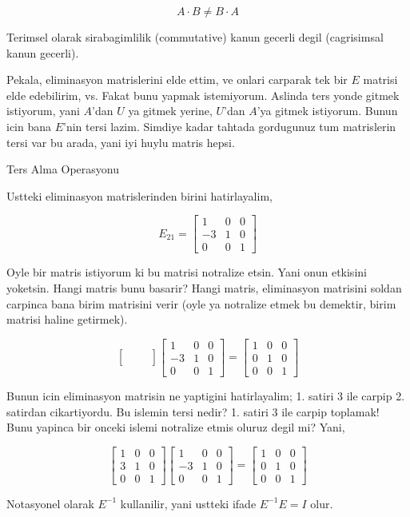 \documentclass[12pt,fleqn]{article}\usepackage{../common}
\begin{document}
$$ A \cdot B \ne B \cdot A $$

Terimsel olarak sirabagimlilik (commutative) kanun gecerli degil
(cagrisimsal kanun gecerli).

Pekala, eliminasyon matrislerini elde ettim, ve onlari carparak tek bir $E$
matrisi elde edebilirim, vs. Fakat bunu yapmak istemiyorum. Aslinda ters
yonde gitmek istiyorum, yani $A$'dan $U$ ya gitmek yerine, $U$'dan $A$'ya
gitmek istiyorum. Bunun icin bana $E$'nin tersi lazim. Simdiye kadar
tahtada gordugunuz tum matrislerin tersi var bu arada, yani iyi huylu
matris hepsi.

Ters Alma Operasyonu

Ustteki eliminasyon matrislerinden birini hatirlayalim, 

$$ E_{21} = \left[\begin{array}{rrr}
1 & 0 & 0 \\
-3 & 1 & 0 \\
0 & 0 & 1
\end{array}\right] $$

Oyle bir matris istiyorum ki bu matrisi notralize etsin. Yani onun etkisini
yoketsin. Hangi matris bunu basarir? Hangi matris, eliminasyon matrisini
soldan carpinca bana birim matrisini verir (oyle ya notralize etmek bu
demektir, birim matrisi haline getirmek). 

$$ 
 \left[\begin{array}{rrr}
 &  &  \\
 &  &  \\
 &  & 
\end{array}\right] 
 \left[\begin{array}{rrr}
1 & 0 & 0 \\
-3 & 1 & 0 \\
0 & 0 & 1
\end{array}\right] 
=
 \left[\begin{array}{rrr}
1 & 0 & 0 \\
0 & 1 & 0 \\
0 & 0 & 1
\end{array}\right] 
$$

Bunun icin eliminasyon matrisin ne yaptigini hatirlayalim; 1. satiri 3 ile
carpip 2. satirdan cikartiyordu. Bu islemin tersi nedir? 1. satiri 3 ile
carpip toplamak! Bunu yapinca bir onceki islemi notralize etmis oluruz
degil mi? Yani,

$$ 
 \left[\begin{array}{rrr}
1 & 0 & 0 \\
3 & 1 & 0 \\
0 & 0 & 1
\end{array}\right] 
 \left[\begin{array}{rrr}
1 & 0 & 0 \\
-3 & 1 & 0 \\
0 & 0 & 1
\end{array}\right] 
=
 \left[\begin{array}{rrr}
1 & 0 & 0 \\
0 & 1 & 0 \\
0 & 0 & 1
\end{array}\right] 
$$

Notasyonel olarak $E^{-1}$ kullanilir, yani ustteki ifade $E^{-1}E = I$ olur.
\end{document}
